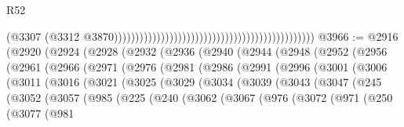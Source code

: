 \begin{lexlean}{R52}
\begin{coremodule}
                                                                                              (@3307
                                                                                                (@3312
                                                                                                  @3870)))))))))))))))))))))))))))))))))))))))))))))))
@3966 := @2916
    (@2920
      (@2924
        (@2928
          (@2932
            (@2936
              (@2940
                (@2944
                  (@2948
                    (@2952
                      (@2956
                        (@2961
                          (@2966
                            (@2971
                              (@2976
                                (@2981
                                  (@2986
                                    (@2991
                                      (@2996
                                        (@3001
                                          (@3006
                                            (@3011
                                              (@3016
                                                (@3021
                                                  (@3025
                                                    (@3029
                                                      (@3034
                                                        (@3039
                                                          (@3043
                                                            (@3047
                                                              (@245
                                                                (@3052
                                                                  (@3057
                                                                    (@985
                                                                      (@225
                                                                        (@240
                                                                          (@3062
                                                                            (@3067
                                                                              (@976
                                                                                (@3072
                                                                                  (@971
                                                                                    (@250
                                                                                      (@3077
                                                                                        (@981

\end{coremodule}
\end{lexlean}

